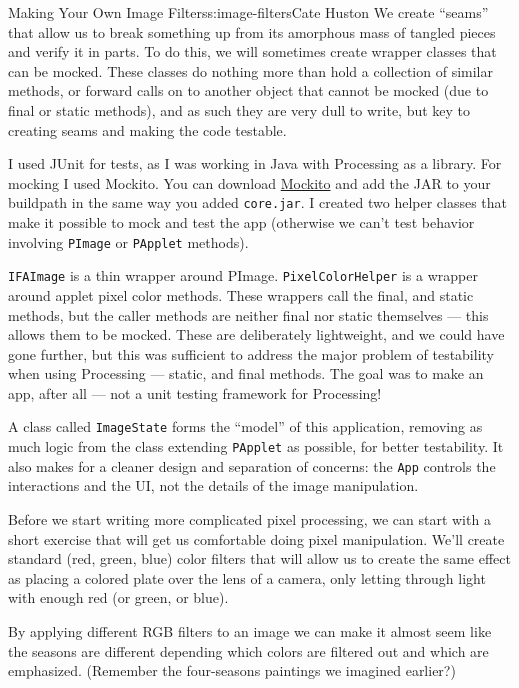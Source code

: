 \begin{aosachapter}{Making Your Own Image Filters}{s:image-filters}{Cate Huston}
We create ``seams'' that allow us to break something up from its
amorphous mass of tangled pieces and verify it in parts. To do this, we
will sometimes create wrapper classes that can be mocked. These classes
do nothing more than hold a collection of similar methods, or forward
calls on to another object that cannot be mocked (due to final or static
methods), and as such they are very dull to write, but key to creating
seams and making the code testable.

I used JUnit for tests, as I was working in Java with Processing as a
library. For mocking I used Mockito. You can download
\href{https://code.google.com/p/mockito/downloads/list}{Mockito} and add
the JAR to your buildpath in the same way you added \texttt{core.jar}. I
created two helper classes that make it possible to mock and test the
app (otherwise we can't test behavior involving \texttt{PImage} or
\texttt{PApplet} methods).

\texttt{IFAImage} is a thin wrapper around PImage.
\texttt{PixelColorHelper} is a wrapper around applet pixel color
methods. These wrappers call the final, and static methods, but the
caller methods are neither final nor static themselves --- this allows
them to be mocked. These are deliberately lightweight, and we could have
gone further, but this was sufficient to address the major problem of
testability when using Processing --- static, and final methods. The
goal was to make an app, after all --- not a unit testing framework for
Processing!

A class called \texttt{ImageState} forms the ``model'' of this
application, removing as much logic from the class extending
\texttt{PApplet} as possible, for better testability. It also makes for
a cleaner design and separation of concerns: the \texttt{App} controls
the interactions and the UI, not the details of the image manipulation.

\label{do-it-yourself-filters}

\label{rgb-filters}

Before we start writing more complicated pixel processing, we can start
with a short exercise that will get us comfortable doing pixel
manipulation. We'll create standard (red, green, blue) color filters
that will allow us to create the same effect as placing a colored plate
over the lens of a camera, only letting through light with enough red
(or green, or blue).

By applying different RGB filters to an image we can make it almost seem
like the seasons are different depending which colors are filtered out
and which are emphasized. (Remember the four-seasons paintings we
imagined earlier?)


\end{aosachapter}
